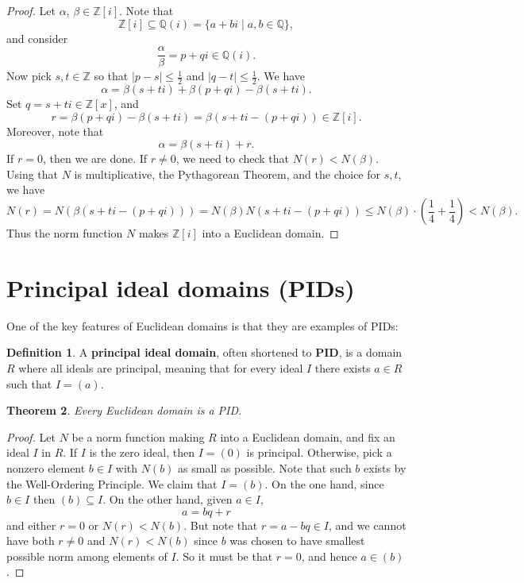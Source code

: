 \documentclass[12pt]{report}
\newtheorem{theorem}{Theorem}[chapter]
\numberwithin{equation}{section}
\numberwithin{theorem}{chapter}
\theoremstyle{definition}
\newtheorem{definition}[theorem]{Definition}
\newtheorem*{basic properties}{Basic Properties}
\newtheorem*{Important Remark}{Important Remark}
\newcommand{\df}[1]{{\bf #1}\index{#1}}
\begin{document}
\begin{proof}
Let $\alpha$, $\beta \in \mathbb{Z}[i]$. Note that
$$\mathbb{Z}[i] \subseteq \mathbb{Q}(i) = \{ a + bi \mid a, b \in \mathbb{Q} \},$$ 
and consider 
$$\frac{\alpha}{\beta}=p+qi \in \mathbb{Q}(i).$$ 
Now pick $s,t\in\mathbb{Z}$ so that $|p-s| \leqslant \frac{1}{2}$ and $|q-t| \leqslant \frac{1}{2}$. We have
$$\alpha = \beta(s+ti)+\beta(p+qi)-\beta(s+ti).$$
Set $q=s+ti \in \mathbb{Z}[x]$, and 
$$r=\beta(p+qi)-\beta(s+ti)=\beta(s+ti-(p+qi)) \in \mathbb{Z}[i].$$
Moreover, note that
$$\alpha = \beta (s+ti) + r.$$ 
If $r=0$, then we are done.
If $r\neq 0$, we need to check that $N(r) < N(\beta)$. Using that $N$ is multiplicative, the Pythagorean Theorem, and the choice for $s,t$, we have
$$N(r)=N(\beta(s+ti-(p+qi)))=N(\beta)N(s+ti-(p+qi))\leqslant N(\beta)\cdot \left( \frac{1}{4}+\frac{1}{4} \right) < N(\beta).$$
Thus the norm function $N$ makes $\mathbb{Z}[i]$ into a Euclidean domain.
\end{proof}



\section{Principal ideal domains (PIDs)}



One of the key features of Euclidean domains is that they are examples of PIDs:


\begin{definition}
	A \df{principal ideal domain}, often shortened to \df{PID}, is a domain $R$ where all ideals are principal, meaning that for every ideal $I$ there exists $a \in R$ such that $I = (a)$.
\end{definition}





\begin{theorem}\label{euclidean domains are pids}
Every Euclidean domain is a PID.
\end{theorem}


\begin{proof} 
Let $N$ be a norm function making $R$ into a Euclidean domain, and fix an ideal $I$ in $R$. If $I$ is the zero ideal, then $I = (0)$ is principal.
 Otherwise, pick a nonzero element $b \in I$ with $N(b)$ as small as possible. Note that such $b$ exists by the Well-Ordering Principle. We claim that $I = (b)$. On the one hand, since $b \in I$ then $(b) \subseteq I$. On the other hand, given $a \in I$,
$$a = bq + r$$
and either $r = 0$ or $N(r) < N(b)$. But note that $r = a - bq \in I$, and we cannot have both $r \neq 0$ and $N(r) < N(b)$ since $b$ was chosen to have smallest possible norm among elements of $I$.
So it must be that $r = 0$, and hence $a \in (b)$.
\end{proof}
\end{document}
